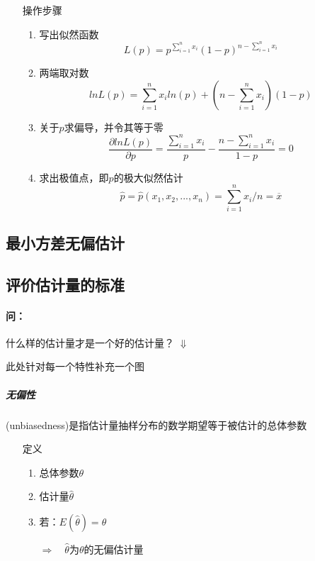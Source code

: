 \documentclass[UTF8,10pt]{book}
\begin{document}
            \begin{itemize}
                \item [操作步骤] {
                    \begin{enumerate}
                        \item 写出似然函数 $$ L(p) =  p^{\sum_{i=1}^n x_i} \left(1-p \right)^{n-\sum_{i=1}^n x_i}$$
                        \item 两端取对数  $$ lnL(p) = \sum_{i=1}^n x_i  ln(p) + \left(n-\sum_{i=1}^n x_i \right) \left(1-p \right)$$
                        \item 关于$p$求偏导，并令其等于零 $$ \frac{\partial lnL(p)}{\partial p} = \frac{\sum_{i=1}^n x_i}{p} - \frac{n-\sum_{i=1}^n x_i}{1-p} =0$$
                        \item 求出极值点，即$p$的极大似然估计 $$ \hat{p} = \hat{p} (x_1,x_2,...,x_n) = \sum_{i=1}^n x_i / n =\overline{x} $$
                        
                    \end{enumerate}
                }
            \end{itemize}

        \subsection{最小方差无偏估计}

        \subsection{评价估计量的标准}

            \paragraph{问：} 什么样的估计量才是一个好的估计量？
            $\Downarrow$

                此处针对每一个特性补充一个图
                
                \subparagraph{无偏性}
                    (unbiasedness)是指估计量抽样分布的{\kaishu 数学期望}等于被估计的总体参数

                        \begin{itemize}
                            \item [定义]{
                            \begin{enumerate}
                                \item 总体参数$\theta$
                                \item 估计量$\hat{\theta}$
                                \item 若：$E(\hat{\theta}) = \theta$
                            
                                $\Rightarrow \quad \hat{\theta}$为$\theta$的无偏估计量
                            \end{enumerate}
                            }
                        \end{itemize}
                    
\end{document}
